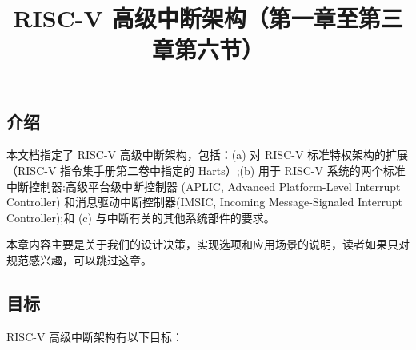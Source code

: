 \begin{translation}
\newcommand{\instbit}[1]{\mbox{\scriptsize #1}}
\newcommand{\instbitrange}[2]{~\instbit{#1} \hfill \instbit{#2}~}
\newcommand{\reglabel}[1]{\hfill {\tt #1}\hfill\ }


\newcommand{\z}[1]{{\tt\catcode`\`=\active\protect\frenchspacing#1}}
\newcommand{\zSafe}[1]{{\tt #1}}
\newcommand{\LB}{\char123}
\newcommand{\RB}{\char125}
\newcommand{\RISCV}{RISC-V}

\newcommand{\WIRI}{\textbf{WIRI}}
\newcommand{\WPRI}{\textbf{WPRI}}
\newcommand{\WLRL}{\textbf{WLRL}}
\newcommand{\WARL}{\textbf{WARL}}

\newcommand{\unspecified}{\textsc{unspecified}}

\title{RISC-V 高级中断架构（第一章至第三章第六节）}
\maketitle

\tableofcontents

\section{介绍}
\label{ch:intro}

本文档指定了 {\RISCV} 高级中断架构，包括：(a) 对 {\RISCV} 标准特权架构的扩展（{\RISCV} 指令集手册第二卷中指定的 Harts）;(b) 用于 {\RISCV} 系统的两个标准中断控制器:高级平台级中断控制器 (APLIC, Advanced Platform-Level Interrupt Controller) 和消息驱动中断控制器(IMSIC, Incoming Message-Signaled Interrupt Controller);和 (c) 与中断有关的其他系统部件的要求。

\begin{commentary}
    本章内容主要是关于我们的设计决策，实现选项和应用场景的说明，读者如果只对规范感兴趣，可以跳过这章。
\end{commentary}

\subsection{目标}

{\RISCV} 高级中断架构有以下目标：
\begin{itemize}


\end{itemize}
\end{translation}
